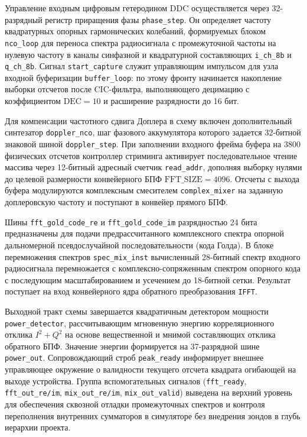 Управление входным цифровым гетеродином DDC осуществляется через 32-разрядный регистр приращения фазы \texttt{phase\_step}. Он определяет частоту квадратурных опорных гармонических колебаний, формируемых блоком \texttt{nco\_loop} для переноса спектра радиосигнала с промежуточной частоты на нулевую частоту в каналы синфазной и квадратурной составляющих \texttt{i\_ch\_8b} и \texttt{q\_ch\_8b}. Сигнал \texttt{start\_capture} служит управляющим импульсом для узла входной буферизации \texttt{buffer\_loop}: по этому фронту начинается накопление выборки отсчетов после CIC-фильтра, выполняющего децимацию с коэффициентом $\text{DEC} = 10$ и расширение разрядности до 16 бит.

Для компенсации частотного сдвига Доплера в схему включен дополнительный синтезатор \texttt{doppler\_nco}, шаг фазового аккумулятора которого задается 32-битной знаковой шиной \texttt{doppler\_step}. При заполнении входного фрейма буфера на 3800 физических отсчетов контроллер стриминга активирует последовательное чтение массива через 12-битный адресный счетчик \texttt{read\_addr}, дополняя выборку нулями до целевой размерности конвейерного БПФ $\text{FFT\_SIZE} = 4096$. Отсчеты с выхода буфера модулируются комплексным смесителем \texttt{complex\_mixer} на заданную доплеровскую частоту и поступают в конвейер прямого БПФ.

Шины \texttt{fft\_gold\_code\_re} и \texttt{fft\_gold\_code\_im} разрядностью 24 бита предназначены для подачи предрассчитанного комплексного спектра опорной дальномерной псевдослучайной последовательности (кода Голда). В блоке перемножения спектров \texttt{spec\_mix\_inst} вычисленный 28-битный спектр входного радиосигнала перемножается с комплексно-сопряженным спектром опорного кода с последующим масштабированием и усечением до 18-битной сетки. Результат поступает на вход конвейерного ядра обратного преобразования \texttt{IFFT}. 

Выходной тракт схемы завершается квадратичным детектором мощности \texttt{power\_detector}, рассчитывающим мгновенную энергию корреляционного отклика $I^2 + Q^2$ на основе вещественной и мнимой составляющих отклика обратного БПФ. Значение энергии формируется на 37-разрядной шине \texttt{power\_out}. Сопровождающий строб \texttt{peak\_ready} информирует внешнее управляющее окружение о валидности текущего отсчета квадрата огибающей на выходе устройства. Группа вспомогательных сигналов (\texttt{fft\_ready}, \texttt{fft\_out\_re/im}, \texttt{mix\_out\_re/im}, \texttt{mix\_out\_valid}) выведена на верхний уровень для обеспечения сквозной отладки промежуточных спектров и контроля переполнения внутренних сумматоров в симуляторе без внедрения зондов в глубь иерархии проекта.


